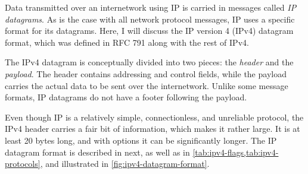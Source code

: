 Data transmitted over an internetwork using IP is carried in messages
called \emph{IP datagrams}. As is the case with all network protocol
messages, IP uses a specific
format for
its datagrams. Here, I will discuss the IP version 4 (IPv4) datagram
format,
which was defined in RFC 791 along with the rest of IPv4.

The IPv4 datagram is conceptually divided into two pieces: the
\emph{header} and the \emph{payload}. The header contains addressing
and control fields, while the payload carries the actual data to be sent
over the internetwork. Unlike some message formats, IP datagrams do not
have a footer following the payload.

Even though IP is a relatively simple, connectionless, and unreliable protocol, the IPv4 header carries a fair bit of information, which makes it rather large.
It is at least 20 bytes long, and with options it can be significantly longer.
The IP datagram format is described in next, as well as in \vref{tab:ipv4-flags,tab:ipv4-protocols}, and illustrated in \vref{fig:ipv4-datagram-format}.

